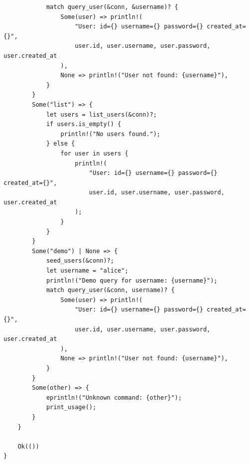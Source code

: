 \documentclass[12pt,a4paper]{ctexart}
\begin{document}
\begin{lstlisting}
            match query_user(&conn, &username)? {
                Some(user) => println!(
                    "User: id={} username={} password={} created_at={}",
                    user.id, user.username, user.password, user.created_at
                ),
                None => println!("User not found: {username}"),
            }
        }
        Some("list") => {
            let users = list_users(&conn)?;
            if users.is_empty() {
                println!("No users found.");
            } else {
                for user in users {
                    println!(
                        "User: id={} username={} password={} created_at={}",
                        user.id, user.username, user.password, user.created_at
                    );
                }
            }
        }
        Some("demo") | None => {
            seed_users(&conn)?;
            let username = "alice";
            println!("Demo query for username: {username}");
            match query_user(&conn, username)? {
                Some(user) => println!(
                    "User: id={} username={} password={} created_at={}",
                    user.id, user.username, user.password, user.created_at
                ),
                None => println!("User not found: {username}"),
            }
        }
        Some(other) => {
            eprintln!("Unknown command: {other}");
            print_usage();
        }
    }

    Ok(())
}

\end{lstlisting}
\end{document}
